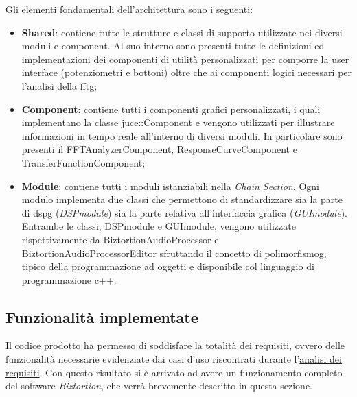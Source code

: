Gli elementi fondamentali dell'architettura sono i seguenti:
\begin{itemize}
    \item \textbf{Shared}: contiene tutte le strutture e classi di supporto utilizzate nei diversi moduli e component. Al suo interno sono presenti tutte le definizioni ed implementazioni dei componenti di utilità personalizzati per comporre la user interface (potenziometri e bottoni) oltre che ai componenti logici necessari per l'analisi della \gls{fftg};
    \item \textbf{Component}: contiene tutti i componenti grafici personalizzati, i quali  implementano la classe juce::Component e vengono utilizzati per illustrare informazioni in tempo reale all'interno di diversi moduli. In particolare sono presenti il FFTAnalyzerComponent, ResponseCurveComponent e TransferFunctionComponent;
    \item \textbf{Module}: contiene tutti i moduli istanziabili nella \textit{Chain Section}. Ogni modulo implementa due classi che permettono di standardizzare sia la parte di \gls{dspg} (\textit{DSPmodule}) sia la parte relativa all'interfaccia grafica (\textit{GUImodule}). Entrambe le classi, DSPmodule e GUImodule, vengono utilizzate rispettivamente da BiztortionAudioProcessor e BiztortionAudioProcessorEditor sfruttando il concetto di \gls{polimorfismog}, tipico della programmazione ad oggetti e disponibile col linguaggio di programmazione c++.
\end{itemize}

\subsection{Funzionalità implementate}
Il codice prodotto ha permesso di soddisfare la totalità dei requisiti, ovvero delle funzionalità necessarie evidenziate dai casi d'uso riscontrati durante l'\hyperref[sez:analisi-requisiti]{analisi dei requisiti}.
Con questo risultato si è arrivato ad avere un funzionamento completo del software \textit{Biztortion}, che verrà brevemente descritto in questa sezione.

